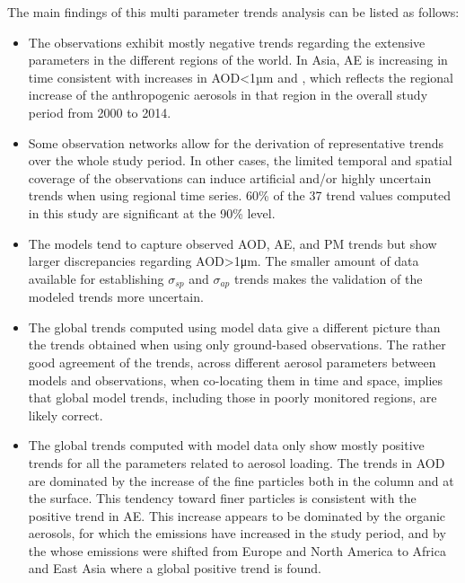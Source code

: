 \documentclass[acp, manuscript]{copernicus}
\begin{document}
The main findings of this multi parameter trends analysis can be listed as follows:
\begin{itemize}
 \item The observations exhibit mostly negative trends regarding the extensive parameters in the different regions of the world. In Asia, AE is increasing in time consistent with increases in AOD<1µm and , which reflects the regional increase of the anthropogenic aerosols in that region in the overall study period from 2000 to 2014.
 \item Some observation networks allow for the derivation of representative trends over the whole study period. In other cases, the limited temporal and spatial coverage of the observations can induce artificial and/or highly uncertain trends when using regional time series. 60\% of the 37 trend values computed in this study are significant at the 90\% level.
 \item The models tend to capture observed AOD, AE,  and PM trends but show larger discrepancies regarding AOD>1μm. The smaller amount of data available for establishing $\sigma_{sp}$ and $\sigma_{ap}$ trends makes the validation of the modeled trends more uncertain.
 \item The global trends computed using model data give a different picture than the trends obtained when using only ground-based observations. The rather good agreement of the trends, across different aerosol parameters between models and observations, when co-locating them in time and space, implies that global model trends, including those in poorly monitored regions, are likely correct.
 \item The global trends computed with model data only show mostly positive trends for all the parameters related to aerosol loading. The trends in AOD are dominated by the increase of the fine particles both in the column and at the surface. This tendency toward finer particles is consistent with the positive trend in AE. This increase appears to be dominated by the organic aerosols, for which the emissions have increased in the study period, and by the  whose emissions were shifted from Europe and North America to Africa and East Asia where a global positive  trend is found.
\end{itemize}
\end{document}
